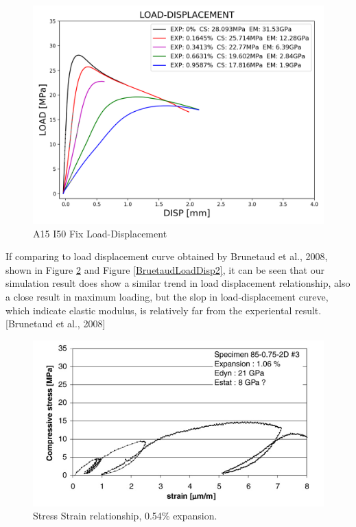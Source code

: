 \begin{figure}[ht!]
\centering
\includegraphics[width=.8\linewidth]{Files/exp_3D/DEF/S13A15FIXX0-LOAD-DISPLACEMENT.png}
  \caption{A15 I50 Fix Load-Displacement}
  \label{fig:A15X0FIX_LD}
\end{figure}

\clearpage

If comparing to load displacement curve obtained by Brunetaud et al., 2008\cite{Bruetaud}, shown in Figure \ref{BruetaudLoadDisp} and Figure \ref{BruetaudLoadDisp2}, it can be seen that our simulation result does show a similar trend in load displacement relationship, also a close result in maximum loading, but the slop in load-displacement cureve, which indicate elastic modulus, is relatively far from the experiental result.[Brunetaud et al., 2008]

\begin{figure}[ht!]
\centering
\includegraphics[width=.8\linewidth]{Reference/BruetaudLoadDisp2.png}
  \caption{Stress Strain relationship, 0.54\% expansion.}
  \label{BruetaudLoadDisp}
\end{figure}

